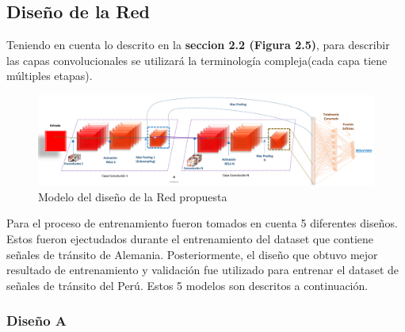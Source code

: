 	\subsection{Diseño de la Red}
	
	Teniendo en cuenta lo descrito en la {\bf seccion 2.2 (Figura 2.5)}, para describir las capas convolucionales se utilizará la terminología compleja(cada capa tiene múltiples etapas).
	
		\begin{figure}[H]
		\includegraphics[width=1\textwidth]{images/desarrollo/networkArquitec/designNet}
		\begin{center}
		\caption{\small{Modelo del diseño de la Red propuesta}}
		\vspace{-1em}
		{\small{\fontsize{10}{16.8}\selectfont {Fuente propia}}}
		\end{center}
		\vspace{-1.5em}
		\end{figure}


	Para el proceso de entrenamiento fueron tomados en cuenta 5 diferentes diseños. Estos fueron ejectudados durante el entrenamiento del dataset que contiene señales de tránsito de Alemania. Posteriormente, el diseño que obtuvo mejor resultado de entrenamiento y validación fue utilizado para entrenar el dataset de señales de tránsito del Perú. Estos 5 modelos son descritos a continuación.
		\vspace{-1.5em}
		\subsubsection{Diseño A} 
		
				
